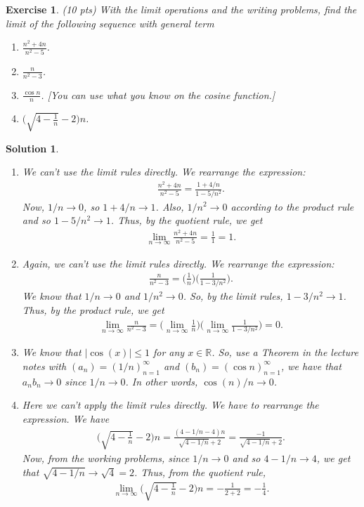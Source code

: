 \documentclass[12pt]{article}
\newcommand{\bR}{\mathbb{R}}
\newcommand{\ra}{\rightarrow}
\theoremstyle{plain}
\newtheorem{exer}{\textbf{Exercise}}}
\theoremstyle{plain}
\newtheorem*{sol}{\textbf{Solution}}}
\theoremstyle{plain}
\theoremstyle{plain}
\begin{document}
\begin{exer}
(10 pts)
With the limit operations and the writing problems, find the limit of the following sequence with general term
	\begin{enumerate}[label=\textbf{\alph*)}]
	\item $\frac{n^2 + 4n}{n^2 - 5}$.
	\item $\frac{n}{n^2 - 3}$.
	\item $\frac{\cos n}{n}$. [You can use what you know on the cosine function.]
	\item $\Big( \sqrt{4 - \frac{1}{n}} - 2 \Big) n$.
	\end{enumerate}
\end{exer}
\begin{sol}
\begin{enumerate}[label=\textbf{\alph*)}]
\item We can't use the limit rules directly. We rearrange the expression:
	\begin{align*}
	\frac{n^2 + 4n}{n^2 - 5} = \frac{1 + 4/n}{1 - 5/n^2} .
	\end{align*}
Now, $1/n \ra 0$, so $1 + 4/n \ra 1$. Also, $1/n^2 \ra 0$ according to the product rule and so $1 - 5/n^2 \ra 1$. Thus, by the quotient rule, we get
	\begin{align*}
	\lim_{n \ra \infty} \frac{n^2 + 4n}{n^2 - 5} = \frac{1}{1} = 1.
	\end{align*}
\item Again, we can't use the limit rules directly. We rearrange the expression:
	\begin{align*}
	\frac{n}{n^2 - 3} = \Big( \frac{1}{n}\Big)  \Big( \frac{1}{1 - 3/n^2} \Big) .
	\end{align*}
We know that $1/n \ra 0$ and $1/n^2 \ra 0$. So, by the limit rules, $1 - 3/n^2 \ra 1$. Thus, by the product rule, we get
	\begin{align*}
	\lim_{n \ra \infty} \frac{n}{n^2 - 3} = \Big( \lim_{n \ra \infty} \frac{1}{n} \Big) \Big( \lim_{n \ra \infty} \frac{1}{1 - 3/n^2} \Big) = 0 .
	\end{align*}
\item We know that $|\cos (x) | \leq 1$ for any $x \in \bR$. So, use a Theorem in the lecture notes with $(a_n) = (1/n)_{n = 1}^\infty$ and $(b_n) = (\cos n )_{n = 1}^\infty$, we have that $a_n b_n \ra 0$ since $1/n \ra 0$. In other words, $\cos (n) /n \ra 0$.
\item Here we can't apply the limit rules directly. We have to rearrange the expression. We have
	\begin{align*}
	\Big( \sqrt{4 - \frac{1}{n}} - 2 \Big) n = \frac{(4 - 1/n -4)n}{\sqrt{4 - 1/n} + 2} = \frac{-1}{\sqrt{4 - 1/n} + 2} .
	\end{align*}
Now, from the working problems, since $1/n \ra 0$ and so $4 - 1/n \ra 4$, we get that $\sqrt{4 - 1/n} \ra \sqrt{4} = 2$. Thus, from the quotient rule,
	\begin{align*}
	\lim_{n \ra \infty} \Big( \sqrt{4 - \frac{1}{n}} - 2 \Big) n = -\frac{1}{2 + 2} = -\frac{1}{4} .
	\end{align*}
\end{enumerate}
\end{sol}
\end{document}
